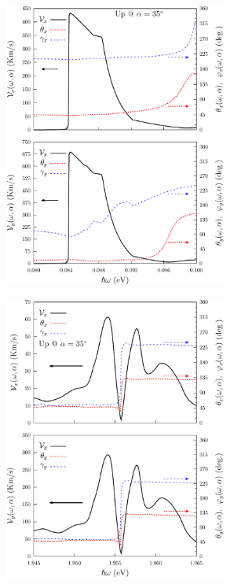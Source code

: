 \documentclass{beamer}
\begin{document}
\begin{frame}

\begin{center}
\includegraphics[width=0.55\textwidth]{figs/fig7.pdf}
\end{center}  

\end{frame}


\begin{frame}

\begin{center}
\includegraphics[width=0.55\textwidth]{figs/fig8.pdf}
\end{center}  

\end{frame}
\end{document}

